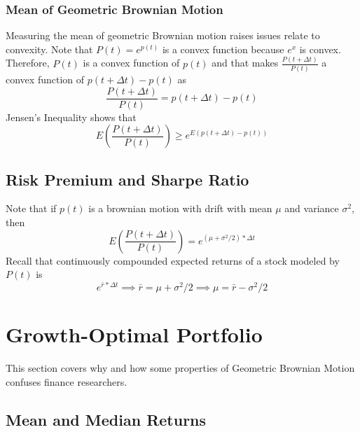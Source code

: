 \documentclass[12pt]{scrartcl}
\begin{document}
\subsubsection{Mean of Geometric Brownian Motion}

Measuring the mean of geometric Brownian motion raises issues relate to convexity. Note that $P(t) = e^{p(t)}$ is a convex function because $e^x$ is convex. Therefore, $P(t)$ is a convex function of $p(t)$ and that makes $\frac{P(t + \Delta t)}{P(t)}$ a convex function of $p(t + \Delta t) - p(t)$ as 
\[\frac{P(t + \Delta t)}{P(t)} = p(t + \Delta t) - p(t)\]
Jensen's Inequality shows that
\[E(\frac{P(t + \Delta t)}{P(t)}) \geq e^{E(p(t + \Delta t) - p(t))}\]

\subsection{Risk Premium and Sharpe Ratio}

Note that if $p(t)$ is a brownian motion with drift with mean $\mu$ and variance $\sigma^2$, then 
\[E(\frac{P(t + \Delta t)}{P(t)}) = e^{(\mu + \sigma^2/2) * \Delta t}\]
Recall that continuously compounded expected returns of a stock modeled by $P(t)$ is
\[e^{\bar{r} * \Delta t} \implies \bar{r} = \mu + \sigma^2/2 \implies \mu = \bar{r} - \sigma^2/2\]

\section{Growth-Optimal Portfolio}

This section covers why and how some properties of Geometric Brownian Motion confuses finance researchers. 

\subsection{Mean and Median Returns}
\end{document}
